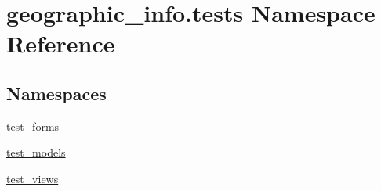 \hypertarget{namespacegeographic__info_1_1tests}{\section{geographic\-\_\-info.\-tests Namespace Reference}
\label{namespacegeographic__info_1_1tests}
}
\subsection*{Namespaces}
\begin{DoxyCompactItemize}
\item 
\hyperlink{namespacegeographic__info_1_1tests_1_1test__forms}{test\-\_\-forms}
\item 
\hyperlink{namespacegeographic__info_1_1tests_1_1test__models}{test\-\_\-models}
\item 
\hyperlink{namespacegeographic__info_1_1tests_1_1test__views}{test\-\_\-views}
\end{DoxyCompactItemize}
